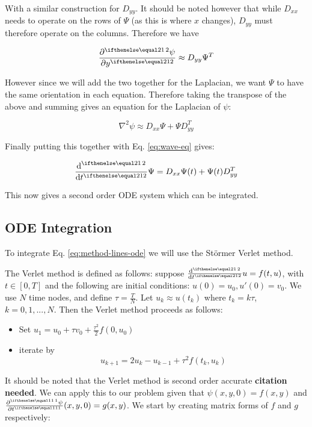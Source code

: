 \documentclass{article}
\begin{document}
With a similar construction for $D_{yy}$.  It should be noted however that
while $D_{xx}$ needs to operate on the rows of $\Psi$ (as this is where $x$
changes), $D_{yy}$ must therefore operate on the columns.  Therefore we have

$$\pder[2]{\psi}{y} \approx D_{yy} \Psi^T$$

However since we will add the two together for the Laplacian, we want $\Psi$ to
have the same orientation in each equation.  Therefore taking the
transpose of the above and summing gives an equation for the
Laplacian of $\psi$:

\begin{equation}
  \label{eq:discrete-laplacian}
  \nabla^2 \psi \approx D_{xx} \Psi + \Psi D_{yy}^T
\end{equation}

Finally putting this together with Eq. \ref{eq:wave-eq} gives:

\begin{equation}
  \label{eq:method-lines-ode}
  \der[2]{}{t} \Psi = D_{xx} \Psi(t) + \Psi(t) D_{yy}^T
\end{equation}

This now gives a second order ODE system which can be integrated.

\subsection{ODE Integration}

To integrate Eq. \ref{eq:method-lines-ode} we will use the
St\"ormer Verlet method.

The Verlet method is defined as follows:
suppose $\der[2]{}{t} u = f(t,u)$, with $t \in \left[0,T\right]$ and the
following are initial conditions:
$u(0) = u_0, u'(0) = v_0$.  We use $N$ time nodes, and define
$\tau = \frac{T}{N}$.  Let $u_k \approx u(t_k)$ where $t_k = k\tau$,
$k = 0, 1, ..., N$. Then the Verlet method proceeds as follows:

\begin{itemize}
  \item Set $u_1 = u_0 + \tau v_0 + \frac{\tau^2}{2} f(0,u_0)$
  \item iterate by
  $$u_{k+1} = 2u_k - u_{k-1} + \tau^2 f(t_k,u_k)$$
\end{itemize}

It should be noted that the Verlet method is second order accurate
\textbf{citation needed}.  We can apply this to our problem given that
$\psi(x,y,0) = f(x,y)$ and $\pder{\psi}{t}(x,y,0) = g(x,y)$.  We start
by creating matrix forms of $f$ and $g$ respectively:
\end{document}
